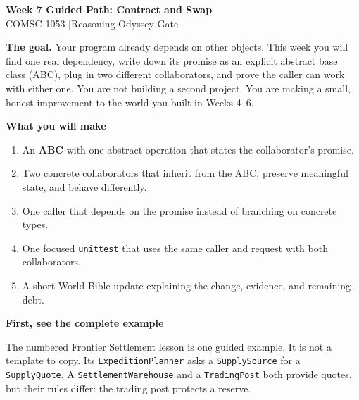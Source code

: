 \documentclass[11pt]{article}
\newcommand{\code}[1]{\texttt{#1}}
\newcommand{\heading}[1]{\vspace{0.6em}\noindent\colorbox{softblue}{\parbox{\dimexpr\linewidth-2\fboxsep}{\large\bfseries\color{navy}#1}}\vspace{0.25em}}
\begin{document}
\begin{center}
{\LARGE\bfseries Week 7 Guided Path: Contract and Swap}\\[0.35em]
{\large COMSC-1053 \quad|\quad Reasoning Odyssey Gate}
\end{center}

\noindent\textbf{The goal.} Your program already depends on other objects.
This week you will find one real dependency, write down its promise as an
explicit abstract base class (ABC), plug in two different collaborators, and
prove the caller can work with either one. You are not building a second
project. You are making a small, honest improvement to the world you built in
Weeks 4--6.

\heading{What you will make}
\begin{enumerate}
  \item An \textbf{ABC} with one abstract operation that states the collaborator's promise.
  \item Two concrete collaborators that inherit from the ABC, preserve meaningful state, and behave differently.
  \item One caller that depends on the promise instead of branching on concrete types.
  \item One focused \texttt{unittest} that uses the same caller and request with both collaborators.
  \item A short World Bible update explaining the change, evidence, and remaining debt.
\end{enumerate}

\heading{First, see the complete example}
The numbered Frontier Settlement lesson is one guided example. It is not a
template to copy. Its \code{ExpeditionPlanner} asks a \code{SupplySource} for a
\code{SupplyQuote}. A \code{SettlementWarehouse} and a \code{TradingPost} both
provide quotes, but their rules differ: the trading post protects a reserve.
\end{document}
